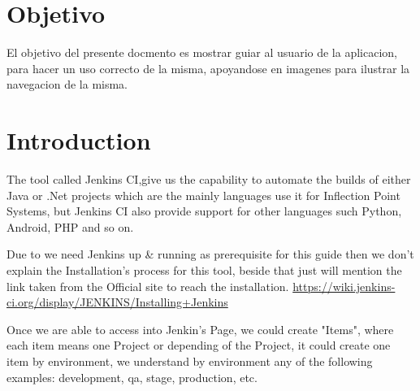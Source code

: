 \documentclass[12pt]{article} %
\begin{document}

\section{Objetivo}

El objetivo del presente docmento es mostrar guiar al usuario de la aplicacion, para hacer un uso correcto de la misma, apoyandose en imagenes para ilustrar la navegacion de la misma.
 

\section{Introduction} %

The tool called Jenkins CI,give us the capability to automate the builds of either Java or .Net projects which are the mainly languages use it for Inflection Point Systems, but Jenkins CI also provide support for other languages such Python, Android, PHP and so on.

Due to we need Jenkins up \& running as prerequisite for this guide then we don't explain the Installation’s process for this tool, beside that just will mention the link taken from the Official site to reach the installation. \url{https://wiki.jenkins-ci.org/display/JENKINS/Installing+Jenkins}

Once we are able to access into Jenkin's Page, we could create "Items", where each item means one Project or depending of the Project, it could create one item by environment, we understand by environment any of the following examples: development, qa, stage, production, etc.




%
%
\end{document}
